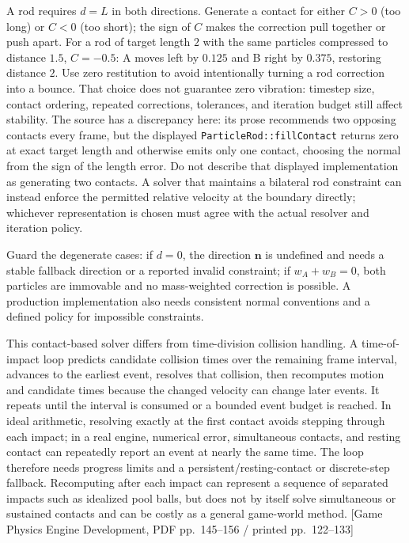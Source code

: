 A rod requires \(d=L\) in both directions. Generate a contact for either \(C>0\) (too long) or \(C<0\) (too short); the sign of \(C\) makes the correction pull together or push apart. For a rod of target length \(2\) with the same particles compressed to distance \(1.5\), \(C=-0.5\): A moves left by \(0.125\) and B right by \(0.375\), restoring distance \(2\). Use zero restitution to avoid intentionally turning a rod correction into a bounce. That choice does not guarantee zero vibration: timestep size, contact ordering, repeated corrections, tolerances, and iteration budget still affect stability. The source has a discrepancy here: its prose recommends two opposing contacts every frame, but the displayed \texttt{ParticleRod::fillContact} returns zero at exact target length and otherwise emits only one contact, choosing the normal from the sign of the length error. Do not describe that displayed implementation as generating two contacts. A solver that maintains a bilateral rod constraint can instead enforce the permitted relative velocity at the boundary directly; whichever representation is chosen must agree with the actual resolver and iteration policy.

Guard the degenerate cases: if \(d=0\), the direction \(\mathbf{n}\) is undefined and needs a stable fallback direction or a reported invalid constraint; if \(w_A+w_B=0\), both particles are immovable and no mass-weighted correction is possible. A production implementation also needs consistent normal conventions and a defined policy for impossible constraints.

This contact-based solver differs from time-division collision handling. A time-of-impact loop predicts candidate collision times over the remaining frame interval, advances to the earliest event, resolves that collision, then recomputes motion and candidate times because the changed velocity can change later events. It repeats until the interval is consumed or a bounded event budget is reached. In ideal arithmetic, resolving exactly at the first contact avoids stepping through each impact; in a real engine, numerical error, simultaneous contacts, and resting contact can repeatedly report an event at nearly the same time. The loop therefore needs progress limits and a persistent/resting-contact or discrete-step fallback. Recomputing after each impact can represent a sequence of separated impacts such as idealized pool balls, but does not by itself solve simultaneous or sustained contacts and can be costly as a general game-world method. {[}Game Physics Engine Development, PDF pp.~145--156 / printed pp.~122--133{]}

